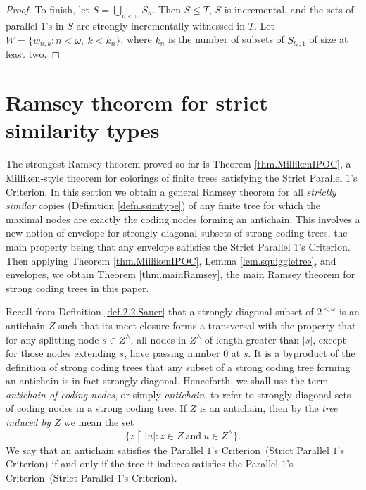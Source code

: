 \documentclass{amsart}
\theoremstyle{remark}
\theoremstyle{definition}
\theoremstyle{remark}
\newcommand{\om}{\omega}
\newcommand{\re}{\restriction}
\newcommand{\POC}{Parallel $1$'s Criterion}
\newcommand{\SPOC}{Strict Parallel $1$'s Criterion}
\begin{document}
\begin{proof}
To finish, let $S=\bigcup_{n<\om} S_n$.
Then $S\le T$, $S$ is incremental, and
the sets of parallel $1$'s in $S$ are strongly incrementally witnessed in $T$.
Let $W=\{w_{n,k}:n<\om,\ k<\tilde{k}_n\}$,
where $\tilde{k}_n$ is the number of subsets of $S_{l_n,1}$ of size at least two.
\end{proof}











\section{Ramsey theorem for  strict similarity types}\label{sec.1color}




The strongest Ramsey theorem  proved  so far is
Theorem \ref{thm.MillikenIPOC},
 a Milliken-style theorem for colorings of  finite trees
 satisfying the \SPOC.
In this section we obtain a
 general Ramsey theorem for all {\em strictly similar} copies (Definition \ref{defn.ssimtype}) of any finite tree for which the maximal nodes are exactly the coding nodes forming an antichain.
This involves a new
notion of envelope for strongly diagonal subsets of  strong coding trees, the main property being that any envelope satisfies the \SPOC.
Then applying Theorem \ref{thm.MillikenIPOC},
Lemma \ref{lem.squiggletree},
and envelopes,
we obtain
 Theorem \ref{thm.mainRamsey},
the main Ramsey theorem for strong coding trees in this paper.


Recall from
Definition \ref{def.2.2.Sauer}
that a strongly diagonal subset of $2^{<\om}$  is an antichain $Z$ such that its meet closure forms a transversal with the property that for any splitting node $s\in Z^{\wedge}$, all   nodes in $Z^{\wedge}$ of length greater than $|s|$, except for those nodes extending $s$,
  have passing number $0$ at $s$.
It is a byproduct of the definition of  strong coding trees
 that any  subset of  a strong coding tree forming an antichain is in fact strongly diagonal.
Henceforth, we shall use the term {\em antichain of coding nodes}, or simply {\em antichain}, to refer to  strongly diagonal sets of coding nodes in a strong coding tree.
If $Z$ is an antichain,
then  by the {\em tree induced by $Z$}
we mean the set
\begin{equation}
\{z\re |u|:z\in Z\mathrm{\ and\ } u\in Z^{\wedge}\}.
\end{equation}
We say that an antichain satisfies the \POC\ (\SPOC) if and only if the tree it induces satisfies the \POC\ (\SPOC).
\end{document}
